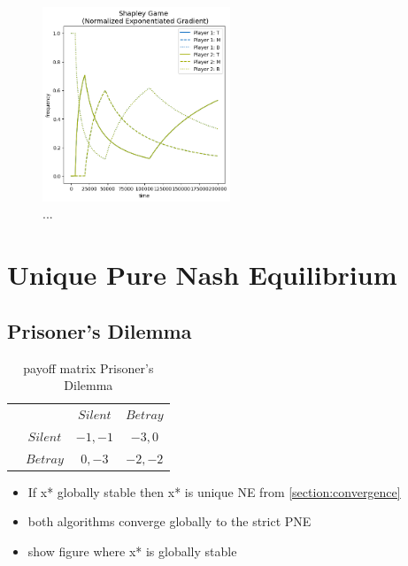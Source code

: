 \begin{figure}
    \centering
    \includegraphics[width=0.5\textwidth]{logos/Shapley2.png}
    \caption{...}
    \label{Shapley2}
\end{figure}



\section{Unique Pure Nash Equilibrium}\label{section:uniquePureNashEquilibrium}

\subsection{Prisoner's Dilemma}\label{subsection:prisonersDilemma}

\begin{table}\centering
\setlength{\extrarowheight}{2pt}
\begin{tabular}{cc|c|c|}
  & \multicolumn{1}{c}{} & \multicolumn{1}{c}{$Silent$}  & \multicolumn{1}{c}{$Betray$} \\\cline{3-4}
  & $Silent$ & $-1,-1$ & $-3,0$ \\\cline{3-4}
  & $Betray$ & $0,-3$ & $-2,-2$ \\\cline{3-4}
\end{tabular}\caption{\label{tab:payoffPrisoners}payoff matrix Prisoner's Dilemma}
\end{table}

\begin{itemize}
    \item If x* globally stable then x* is unique NE from \ref{section:convergence}
    \item both algorithms converge globally to the strict PNE
    \item show figure where x* is globally stable
\end{itemize}

